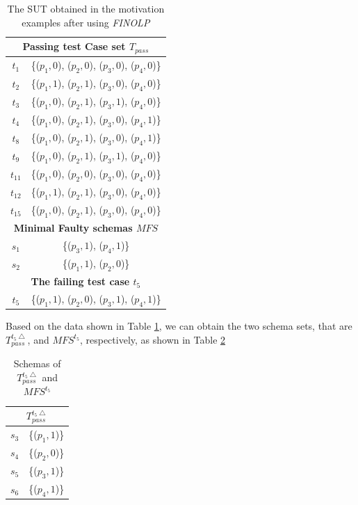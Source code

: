 {\begin{table}[htbp]
  \centering
  \caption{The SUT obtained in the motivation examples after using \emph{FINOLP}}
  \label{ex:sutwithfinolp}
    \begin{tabular}{|c|c|} \hline
     \multicolumn{2}{|c|}{\textbf{Passing test Case set $T_{pass}$}} \\ \hline
  $t_{1}$ & \{($p_{1}, 0$), ($p_{2}, 0$), ($p_{3}, 0$), ($p_{4}, 0$)\}\\
  $t_{2}$ & \{($p_{1}, 1$), ($p_{2}, 1$), ($p_{3}, 0$), ($p_{4}, 0$)\}\\
  $t_{3}$ & \{($p_{1}, 0$), ($p_{2}, 1$), ($p_{3}, 1$), ($p_{4}, 0$)\}\\
  $t_{4}$ & \{($p_{1}, 0$), ($p_{2}, 1$), ($p_{3}, 0$), ($p_{4}, 1$)\}\\


  $t_{8}$ & \{($p_{1}, 0$), ($p_{2}, 1$), ($p_{3}, 0$), ($p_{4}, 1$)\}\\
  $t_{9}$ & \{($p_{1}, 0$), ($p_{2}, 1$), ($p_{3}, 1$), ($p_{4}, 0$)\}\\

  $t_{11}$ & \{($p_{1}, 0$), ($p_{2}, 0$), ($p_{3}, 0$), ($p_{4}, 0$)\}\\
  $t_{12}$ & \{($p_{1}, 1$), ($p_{2}, 1$), ($p_{3}, 0$), ($p_{4}, 0$)\}\\
  $t_{15}$ & \{($p_{1}, 0$), ($p_{2}, 1$), ($p_{3}, 0$), ($p_{4}, 0$)\}\\

  \hline

     \multicolumn{2}{|c|}{\textbf{Minimal Faulty schemas $MFS$}} \\ \hline
  $s_{1}$ & \{($p_{3}, 1$), ($p_{4}, 1$)\} \\
  $s_{2}$ & \{($p_{1}, 1$), ($p_{2}, 0$)\} \\ \hline
  \multicolumn{2}{|c|}{\textbf{The failing test case $t_{5}$}} \\ \hline
  $t_{5}$ & \{($p_{1}, 1$), ($p_{2}, 0$), ($p_{3}, 1$), ($p_{4}, 1$)\} \\ \hline
    \end{tabular}%
\end{table}

Based on the data shown in Table \ref{ex:sutwithfinolp}, we can obtain the two schema sets, that are  $T_{pass}^{t_{5}\bigtriangleup}$, and $MFS^{t_{5}}$, respectively, as shown in Table \ref{ex:sutwithfinolptwodata}

\begin{table}[htbp]
  \centering
  \caption{Schemas of $T_{pass}^{t_{5}\bigtriangleup}$ and $MFS^{t_{5}}$}
  \label{ex:sutwithfinolptwodata}
    \begin{tabular}{|c|c|} \hline
     \multicolumn{2}{|c|}{$T_{pass}^{t_{5}\bigtriangleup}$} \\ \hline
  $s_{3}$ & \{($p_{1}, 1$)\}\\
  $s_{4}$ & \{($p_{2}, 0$)\}\\
  $s_{5}$ & \{($p_{3}, 1$)\}\\
  $s_{6}$ & \{($p_{4}, 1$)\}\\


\end{tabular}
\end{table}}
